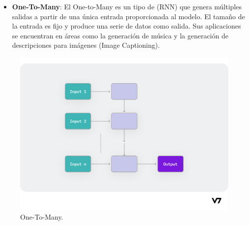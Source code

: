 \documentclass{article}
\begin{document}
\begin{itemize}
    \item \textbf{One-To-Many}: El One-to-Many es un tipo de (RNN) que genera múltiples salidas a partir de una única entrada proporcionada al modelo. El tamaño de la entrada es fijo y produce una serie de datos como salida. Sus aplicaciones se encuentran en áreas como la generación de música y la generación de descripciones para imágenes (Image Captioning).
\end{itemize}

\begin{figure}[H]
    \centering
    \includegraphics[scale=0.25]{mto.png}
    \caption{One-To-Many.}
\end{figure}

\newpage
\end{document}
